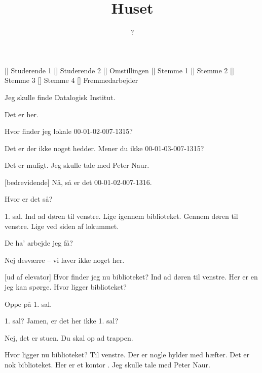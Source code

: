 \documentclass[a4paper,11pt]{article}
\title{Huset}
\author{?}
\begin{document}
\maketitle

\begin{roles}
[] Studerende 1
[] Studerende 2
[] Omstillingen
[] Stemme 1
[] Stemme 2
[] Stemme 3
[] Stemme 4
[] Fremmedarbejder
\end{roles}

\begin{sketch}



 Jeg skulle finde Datalogisk Institut.

 Det er her.

 Hvor finder jeg lokale 00-01-02-007-1315?

 Det er der ikke noget hedder.  Mener du ikke
00-01-03-007-1315?

 Det er muligt.  Jeg skulle tale med Peter Naur.

[bedrevidende] Nå, så er det 00-01-02-007-1316.

 Hvor er det så?

 1. sal.  Ind ad døren til venstre.  Lige igennem biblioteket.
Gennem døren til venstre.  Lige ved siden af lokummet.


 De ha' arbejde jeg få?

 Nej desværre -- vi laver ikke noget her.

[ud af elevator] Hvor finder jeg nu biblioteket?  Ind ad
døren til venstre.  Her er en jeg kan spørge.  Hvor ligger
biblioteket?

 Oppe på 1. sal.

 1. sal?  Jamen, er det her ikke 1. sal?

 Nej, det er stuen.  Du skal op ad trappen.



 Hvor ligger nu biblioteket?  Til venstre.  Der er nogle
hylder med hæfter.  Det er nok biblioteket.  Her er et kontor
.  Jeg skulle tale med Peter Naur.


\end{sketch}
\end{document}
